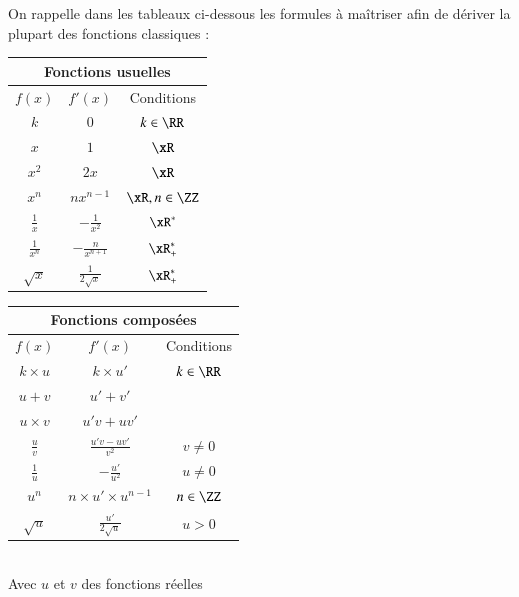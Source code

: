 \documentclass[oneside,12pt]{article}
\begin{document}
On rappelle dans les tableaux ci-dessous les formules à maîtriser afin de dériver la plupart des fonctions classiques :

\begin{minipage}[t]{0.45\linewidth}
\center
\renewcommand{\arraystretch}{1.54}
\begin{tabular}{ | c | c | c |}
    \hline
    \multicolumn{3}{|c|}{\textbf{Fonctions usuelles}} \\ \hline
    $f(x)$ & $f'(x)$ & Conditions \\ \hline \hline
    $k$ & $0$ & $k\in\RR$ \\ \hline
    $x$ & $1$& $\xR$\\ \hline
    $x^{2}$ & $2x$& $\xR$\\ \hline
    $x^{n}$ & $nx^{n-1}$ & $\xR , n\in \ZZ$\\ \hline
    $\frac{1}{x}$ & $-\frac{1}{x^{2}}$ & $\xR^{*}$ \\ \hline
    $\frac{1}{x^{n}}$ & $-\frac{n}{x^{n+1}}$ & $\xR_{+}^{*}$ \\ \hline
    $\sqrt{x}$ & $\frac{1}{2\sqrt{x}}$ & $\xR^{*}_{+}$ \\ \hline
    \end{tabular}

\end{minipage} \hfill
\begin{minipage}[t]{0.55\linewidth}
\center
\renewcommand{\arraystretch}{1.7}
\begin{tabular}{ | c | c | c |}
    \hline
    \multicolumn{3}{|c|}{\textbf{Fonctions composées}} \\ \hline
    $f(x)$ & $f'(x)$ & Conditions \\ \hline \hline
    $k\times u$ & $k\times u'$ & $k\in\RR$ \\ \hline
    $u+v$ & $u'+v'$ & \\ \hline
    $u\times v$ & $u'v+uv'$& \\ \hline
    $\frac{u}{v}$ & $\frac{u'v-uv'}{v^{2}}$& $v\neq 0$\\ \hline
    $\frac{1}{u}$ & $-\frac{u'}{u^2}$ & $u\neq0$ \\ \hline
    $u^{n}$ & $n\times u'\times  u^{n-1}$ & $n\in \ZZ$\\ \hline
    $\sqrt{u}$ & $\frac{u'}{2\sqrt{u}}$ & $u > 0$ \\ \hline
\end{tabular} \\[5pt]
Avec $u$ et $v$ des fonctions réelles
\end{minipage}
\end{document}
